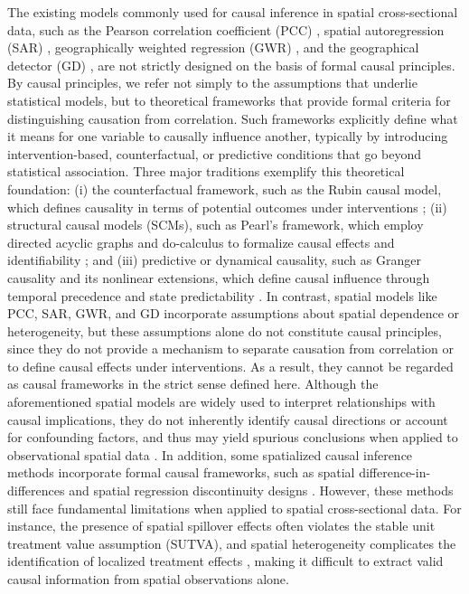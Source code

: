 \documentclass[authoryear,preprint,review,12pt]{elsarticle}
\begin{document}
The existing models commonly used for causal inference in spatial cross-sectional data, such as the Pearson correlation coefficient (PCC) \citep{pearson1895pcc}, spatial autoregression (SAR) \citep{anselin2013sar}, geographically weighted regression (GWR) \citep{fotheringham2003gwr,fotheringham2017mgwr}, and the geographical detector (GD) \citep{wang2010gd1,lyu2025gdverse}, are not strictly designed on the basis of formal causal principles. By causal principles, we refer not simply to the assumptions that underlie statistical models, but to theoretical frameworks that provide formal criteria for distinguishing causation from correlation. Such frameworks explicitly define what it means for one variable to causally influence another, typically by introducing intervention-based, counterfactual, or predictive conditions that go beyond statistical association. Three major traditions exemplify this theoretical foundation: (i) the counterfactual framework, such as the Rubin causal model, which defines causality in terms of potential outcomes under interventions \citep{rubin2005pom3}; (ii) structural causal models (SCMs), such as Pearl’s framework, which employ directed acyclic graphs and do-calculus to formalize causal effects and identifiability \citep{pearl2018scm4}; and (iii) predictive or dynamical causality, such as Granger causality and its nonlinear extensions, which define causal influence through temporal precedence and state predictability \citep{granger1969grangertest,schreiber2000te1,sugihara2012ccm}. In contrast, spatial models like PCC, SAR, GWR, and GD incorporate assumptions about spatial dependence or heterogeneity, but these assumptions alone do not constitute causal principles, since they do not provide a mechanism to separate causation from correlation or to define causal effects under interventions. As a result, they cannot be regarded as causal frameworks in the strict sense defined here. Although the aforementioned spatial models are widely used to interpret relationships with causal implications, they do not inherently identify causal directions or account for confounding factors, and thus may yield spurious conclusions when applied to observational spatial data \citep{gao2022ciss}. In addition, some spatialized causal inference methods incorporate formal causal frameworks, such as spatial difference-in-differences \citep{delgado2015sdid} and spatial regression discontinuity designs \citep{kolak2019srdd}. However, these methods still face fundamental limitations when applied to spatial cross-sectional data. For instance, the presence of spatial spillover effects often violates the stable unit treatment value assumption (SUTVA), and spatial heterogeneity complicates the identification of localized treatment effects \citep{akbari2021spatialcausality,gao2023gccm}, making it difficult to extract valid causal information from spatial observations alone.
\end{document}
